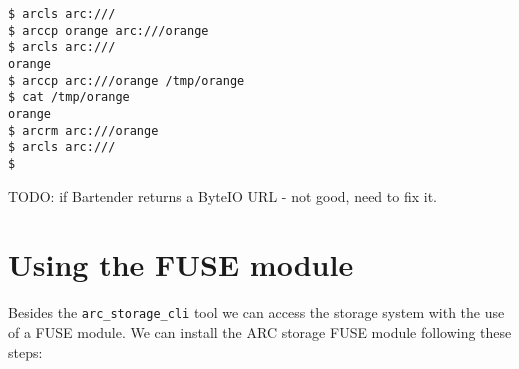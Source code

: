\documentclass{book}
\begin{document}
\begin{verbatim}
$ arcls arc:///
$ arccp orange arc:///orange
$ arcls arc:///
orange
$ arccp arc:///orange /tmp/orange
$ cat /tmp/orange 
orange
$ arcrm arc:///orange
$ arcls arc:///
$ 
\end{verbatim}

TODO: if Bartender returns a ByteIO URL - not good, need to fix it.

\section{Using the FUSE module} %
\label{sec:using_the_fuse_module}

Besides the \verb!arc_storage_cli! tool we can access the storage system with the use of a FUSE module. We can install the ARC storage FUSE module following these steps:
\end{document}
